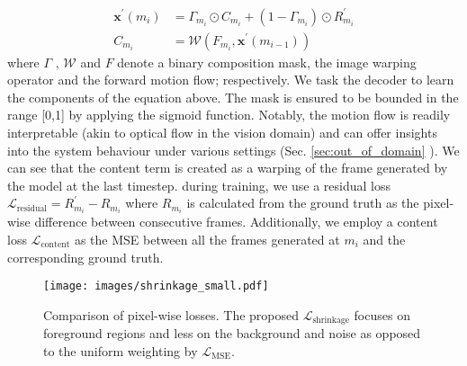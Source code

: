 \documentclass[10pt, conference, compsocconf]{IEEEtran}
\begin{document}
\begin{align}
    \label{eq:composition}
    \mathbf{x}^\prime(m_i) & = \Gamma_{m_i} \odot C_{m_i} + (1 - \Gamma_{m_i}) \odot R^\prime_{m_i} \\
    \label{eq:content}
    C_{m_i} & = \mathcal{W}(F_{m_i}, \mathbf{x}^\prime(m_{i-1}) )
\end{align}
where $\Gamma$ , $\mathcal{W}$  and $F$  denote a binary composition mask, the image warping operator and the forward motion flow; respectively. We task the decoder to learn the components of the equation above. The mask is ensured to be bounded in the range [0,1] by applying the sigmoid function. Notably, the motion flow is readily interpretable (akin to optical flow in the vision domain) and can offer insights into the system behaviour under various settings (Sec. \ref{sec:out_of_domain} ).   We can see that the content term is created as a warping of the frame generated by the model at the last timestep. during training, we use a residual loss $\mathcal{L}_{\text{residual}} = R^{\prime}_{m_i} - R_{m_i}$  where $R_{m_i}$ is calculated from the ground truth as the pixel-wise difference between consecutive frames. Additionally, we employ a content loss $\mathcal{L}_{\text{content}}$ as the MSE between all the frames generated at $m_i$ and the corresponding ground truth.



\begin{figure}[!t]
    \centering
    \texttt{[image: images/shrinkage\_small.pdf]}
    \caption{Comparison of pixel-wise losses. 
    The proposed $\mathcal{L}_{\text{shrinkage}}$ focuses on foreground regions and less on the background and noise as opposed to the uniform weighting by $\mathcal{L}_{\text{MSE}}$. }
    \label{fig:shrinkage}

\end{figure}
\end{document}
